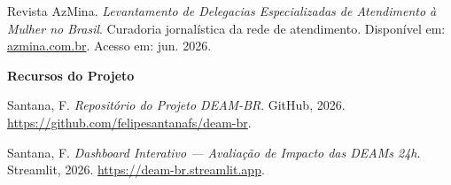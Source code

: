 \documentclass[twocolumn, 10pt]{article}
\begin{document}
Revista AzMina. \textit{Levantamento de Delegacias Especializadas de
Atendimento à Mulher no Brasil}. Curadoria jornalística da rede de atendimento.
Disponível em: \href{https://azmina.com.br}{azmina.com.br}. Acesso em: jun. 2026.

\smallskip
\textbf{Recursos do Projeto}

Santana, F. \textit{Repositório do Projeto DEAM-BR}. GitHub, 2026.
\href{https://github.com/felipesantanafs/deam-br}{https://github.com/felipesantanafs/deam-br}.

Santana, F. \textit{Dashboard Interativo — Avaliação de Impacto das DEAMs 24h}.
Streamlit, 2026.
\href{https://deam-br.streamlit.app}{https://deam-br.streamlit.app}.

\endgroup
\end{document}
